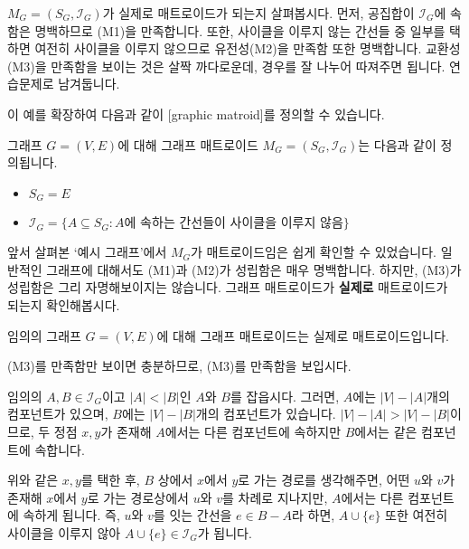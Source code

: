 \documentclass[11pt, a4paper]{book}
\newcommand{\I}{\mathcal{I}}
\begin{document}
    $M_G = (S_G, \I_G)$가 실제로 매트로이드가 되는지 살펴봅시다. 먼저, 공집합이 $\I_G$에 속함은 명백하므로 (M1)을 만족합니다. 또한, 사이클을 이루지 않는 간선들 중 일부를 택하면 여전히 사이클을 이루지 않으므로 유전성(M2)을 만족함 또한 명백합니다. 교환성(M3)을 만족함을 보이는 것은 살짝 까다로운데, 경우를 잘 나누어 따져주면 됩니다. 연습문제로 남겨둡니다.
    
    이 예를 확장하여 다음과 같이 [graphic matroid]를 정의할 수 있습니다.
    
    \begin{MLDef}
        그래프 $G = (V, E)$에 대해 그래프 매트로이드 $M_G = (S_G, \I_G)$는 다음과 같이 정의됩니다.
        \begin{itemize}
            \item $S_G = E$
            \item $\I_G = \{A \subseteq S_G : A\text{에 속하는 간선들이 사이클을 이루지 않음}\}$
        \end{itemize}
    \end{MLDef}
    
    앞서 살펴본 `예시 그래프'에서 $M_G$가 매트로이드임은 쉽게 확인할 수 있었습니다. 일반적인 그래프에 대해서도 (M1)과 (M2)가 성립함은 매우 명백합니다. 하지만, (M3)가 성립함은 그리 자명해보이지는 않습니다. 그래프 매트로이드가 \textbf{실제로} 매트로이드가 되는지 확인해봅시다.
    
    \begin{MLThm}
        임의의 그래프 $G = (V, E)$에 대해 그래프 매트로이드는 실제로 매트로이드입니다.
    \end{MLThm}
    
    \begin{MLPrf}
        (M3)를 만족함만 보이면 충분하므로, (M3)를 만족함을 보입시다.
        
        임의의 $A, B \in \I_G$이고 $|A| < |B|$인 $A$와 $B$를 잡읍시다. 그러면, $A$에는 $|V|-|A|$개의 컴포넌트가 있으며, $B$에는 $|V|-|B|$개의 컴포넌트가 있습니다. $|V|-|A| > |V|-|B|$이므로, 두 정점 $x, y$가 존재해 $A$에서는 다른 컴포넌트에 속하지만 $B$에서는 같은 컴포넌트에 속합니다.
        
        위와 같은 $x, y$를 택한 후, $B$ 상에서 $x$에서 $y$로 가는 경로를 생각해주면, 어떤 $u$와 $v$가 존재해 $x$에서 $y$로 가는 경로상에서 $u$와 $v$를 차례로 지나지만, $A$에서는 다른 컴포넌트에 속하게 됩니다. 즉, $u$와 $v$를 잇는 간선을 $e \in B - A$라 하면, $A \cup \{e\}$ 또한 여전히 사이클을 이루지 않아 $A \cup \{e\} \in \I_G$가 됩니다.
    \end{MLPrf}
    
\end{document}
